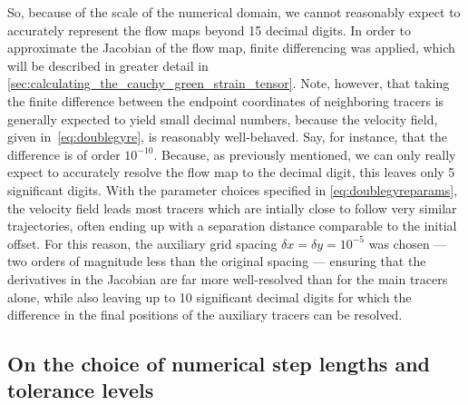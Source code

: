 So, because of the scale of the numerical domain, we cannot reasonably expect
to accurately represent the flow maps beyond 15 decimal digits. In order to
approximate the Jacobian of the flow map, finite differencing was applied,
which will be described in greater detail in
\cref{sec:calculating_the_cauchy_green_strain_tensor}. Note, however, that
taking the finite difference between the endpoint coordinates of neighboring
tracers is generally expected to yield small decimal numbers, because the
velocity field, given in~\cref{eq:doublegyre}, is reasonably
well-behaved. Say, for instance, that the difference is of order $10^{-10}$.
Because, as previously mentioned, we can only really expect to accurately
resolve the flow map to the  decimal digit, this leaves only 5
significant digits. With the parameter choices specified in
\cref{eq:doublegyreparams}, the velocity field leads most tracers which
are intially close to follow very similar trajectories, often ending up
with a separation distance comparable to the initial offset. For this reason,
the auxiliary grid spacing $\delta{x}=\delta{y}=10^{-5}$ was chosen --- two
orders of magnitude less than the original spacing --- ensuring that the
derivatives in the Jacobian are far more well-resolved than for the main
tracers alone, while also leaving up to 10 significant decimal digits for
which the difference in the final positions of the auxiliary tracers can be
resolved.
\clearpage
%
\subsection{On the choice of numerical step lengths and tolerance levels}
\label{sub:on_the_choice_of_numerical_step_lengths_and_tolerance_levels}

